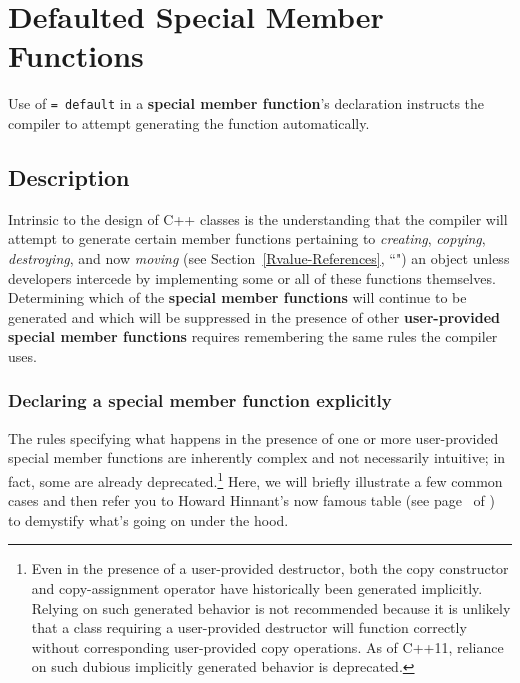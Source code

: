 \newpage
\section[Defaulted Special Member Functions]{Defaulted Special Member Functions}\label{Defaulted-Special-Member-Functions}\label{defaulted-special-member-functions}


Use of \texttt{=}~\texttt{default} in a \textbf{special member function}'s
declaration instructs the compiler to attempt generating the function
automatically.

\subsection[Description]{Description}\label{description}

Intrinsic to the design of C++ classes is the understanding that the
compiler will attempt to generate certain member functions pertaining to
\emph{creating}, \emph{copying}, \emph{destroying}, and now
\emph{moving} (see Section~\ref{Rvalue-References}, ``") an object unless
developers intercede by implementing some or all of these functions
themselves. Determining which of the \textbf{special member functions}
will continue to be generated and which will be suppressed in the
presence of other \textbf{user-provided special member functions}
requires remembering the same rules the compiler uses.

\subsubsection[Declaring a special member function explicitly]{Declaring a special member function explicitly}\label{declaring-a-special-member-function-explicitly}

The rules specifying what happens in the presence of one or more
user-provided special member functions are inherently complex and not
necessarily intuitive; in fact, some are already
deprecated.{\cprotect\footnote{Even in the presence of a user-provided
destructor, both the copy constructor and copy-assignment operator
have historically been generated implicitly. Relying on such generated
behavior is not recommended because it is unlikely that a class
requiring a user-provided destructor will function correctly without
corresponding user-provided copy operations. As of C++11, reliance on
such dubious implicitly generated behavior is deprecated.}} Here, we
will briefly illustrate a few common cases and then refer you to Howard
Hinnant's now famous table (see page~\pageref{default-table1} of {\it{}}) to
demystify what's going on under the hood.

